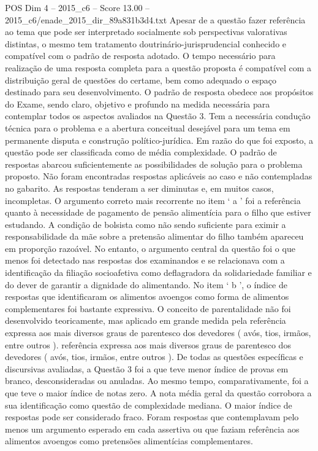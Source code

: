 \begin{textsample}{POS Dim 4 – 2015\_c6 – Score 13.00 – 2015\_c6/enade\_2015\_dir\_89a831b3d4.txt}
Apesar de a questão fazer referência ao tema que pode ser interpretado socialmente sob perspectivas valorativas distintas, o mesmo tem tratamento doutrinário-jurisprudencial conhecido e compatível com o padrão de resposta adotado.
O tempo necessário para realização de uma resposta completa para a questão proposta é compatível com a distribuição geral de questões do certame, bem como adequado o espaço destinado para seu desenvolvimento.
O padrão de resposta obedece aos propósitos do Exame, sendo claro, objetivo e profundo na medida necessária para contemplar todos os aspectos avaliados na Questão 3.
Tem a necessária condução técnica para o problema e a abertura conceitual desejável para um tema em permanente disputa e construção político-jurídica.
Em razão do que foi exposto, a questão pode ser classificada como de média complexidade.
O padrão de respostas abarcou suficientemente as possibilidades de solução para o problema proposto.
Não foram encontradas respostas aplicáveis ao caso e não contempladas no gabarito.
As respostas tenderam a ser diminutas e, em muitos casos, incompletas.
O argumento correto mais recorrente no item ‘ a ’ foi a referência quanto à necessidade de pagamento de pensão alimentícia para o filho que estiver estudando.
A condição de bolsista como não sendo suficiente para eximir a responsabilidade da mãe sobre a pretensão alimentar do filho também apareceu em proporção razoável.
No entanto, o argumento central da questão foi o que menos foi detectado nas respostas dos examinandos e se relacionava com a identificação da filiação socioafetiva como deflagradora da solidariedade familiar e do dever de garantir a dignidade do alimentando.
No item ‘ b ’, o índice de respostas que identificaram os alimentos avoengos como forma de alimentos complementares foi bastante expressiva.
O conceito de parentalidade não foi desenvolvido teoricamente, mas aplicado em grande medida pela referência expressa aos mais diversos graus de parentesco dos devedores ( avós, tios, irmãos, entre outros ). referência expressa aos mais diversos graus de parentesco dos devedores ( avós, tios, irmãos, entre outros ).
De todas as questões específicas e discursivas avaliadas, a Questão 3 foi a que teve menor índice de provas em branco, desconsideradas ou anuladas.
Ao mesmo tempo, comparativamente, foi a que teve o maior índice de notas zero.
A nota média geral da questão corrobora a sua identificação como questão de complexidade mediana.
O maior índice de respostas pode ser considerado fraco.
Foram respostas que contemplavam pelo menos um argumento esperado em cada assertiva ou que faziam referência aos alimentos avoengos como pretensões alimentícias complementares.

\end{textsample}
